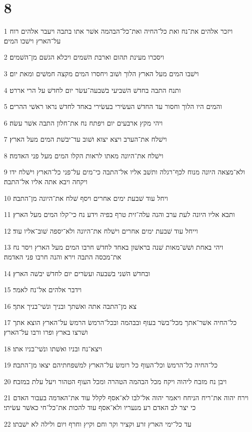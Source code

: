 \chapter{8}

\par 1 ויזכר אלהים את־נח ואת כל־החיה ואת־כל־הבהמה אשׁר אתו בתבה ויעבר אלהים רוח על־הארץ וישׁכו המים׃
\par 2 ויסכרו מעינת תהום וארבת השׁמים ויכלא הגשׁם מן־השׁמים׃
\par 3 וישׁבו המים מעל הארץ הלוך ושׁוב ויחסרו המים מקצה חמשׁים ומאת יום׃
\par 4 ותנח התבה בחדשׁ השׁביעי בשׁבעה־עשׂר יום לחדשׁ על הרי אררט׃
\par 5 והמים היו הלוך וחסור עד החדשׁ העשׂירי בעשׂירי באחד לחדשׁ נראו ראשׁי ההרים׃
\par 6 ויהי מקץ ארבעים יום ויפתח נח את־חלון התבה אשׁר עשׂה׃
\par 7 וישׁלח את־הערב ויצא יצוא ושׁוב עד־יבשׁת המים מעל הארץ׃
\par 8 וישׁלח את־היונה מאתו לראות הקלו המים מעל פני האדמה׃
\par 9 ולא־מצאה היונה מנוח לכף־רגלה ותשׁב אליו אל־התבה כי־מים על־פני כל־הארץ וישׁלח ידו ויקחה ויבא אתה אליו אל־התבה׃
\par 10 ויחל עוד שׁבעת ימים אחרים ויסף שׁלח את־היונה מן־התבה׃
\par 11 ותבא אליו היונה לעת ערב והנה עלה־זית טרף בפיה וידע נח כי־קלו המים מעל הארץ׃
\par 12 וייחל עוד שׁבעת ימים אחרים וישׁלח את־היונה ולא־יספה שׁוב־אליו עוד׃
\par 13 ויהי באחת ושׁשׁ־מאות שׁנה בראשׁון באחד לחדשׁ חרבו המים מעל הארץ ויסר נח את־מכסה התבה וירא והנה חרבו פני האדמה׃
\par 14 ובחדשׁ השׁני בשׁבעה ועשׂרים יום לחדשׁ יבשׁה הארץ׃
\par 15 וידבר אלהים אל־נח לאמר׃
\par 16 צא מן־התבה אתה ואשׁתך ובניך ונשׁי־בניך אתך׃
\par 17 כל־החיה אשׁר־אתך מכל־בשׂר בעוף ובבהמה ובכל־הרמשׂ הרמשׂ על־הארץ הוצא אתך ושׁרצו בארץ ופרו ורבו על־הארץ׃
\par 18 ויצא־נח ובניו ואשׁתו ונשׁי־בניו אתו׃
\par 19 כל־החיה כל־הרמשׂ וכל־העוף כל רומשׂ על־הארץ למשׁפחתיהם יצאו מן־התבה׃
\par 20 ויבן נח מזבח ליהוה ויקח מכל הבהמה הטהרה ומכל העוף הטהור ויעל עלת במזבח׃
\par 21 וירח יהוה את־ריח הניחח ויאמר יהוה אל־לבו לא־אסף לקלל עוד את־האדמה בעבור האדם כי יצר לב האדם רע מנעריו ולא־אסף עוד להכות את־כל־חי כאשׁר עשׂיתי׃
\par 22 עד כל־ימי הארץ זרע וקציר וקר וחם וקיץ וחרף ויום ולילה לא ישׁבתו׃

